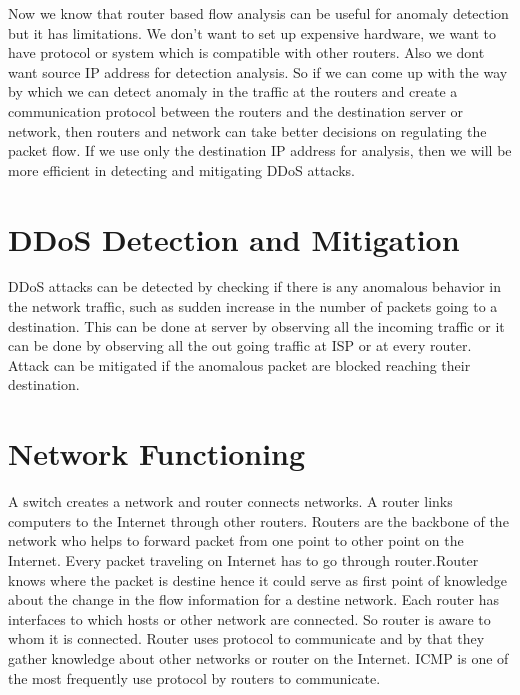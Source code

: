 \documentclass[10pt,oneside,a4paper]{article}
\begin{document}
Now we know that router based flow analysis can be useful for anomaly detection but it has limitations. We don't want to set up expensive hardware, we want to have protocol or system which is compatible with other routers. Also we dont want source IP address for detection analysis. So if we can come up with the way by which we can detect anomaly in the traffic at the routers and create a communication protocol between the routers and the destination server or network, then routers and network can take better decisions on regulating the packet flow. If we use only the destination IP address for analysis, then we will be more efficient in detecting and mitigating DDoS attacks.

\section{DDoS Detection and Mitigation}

DDoS attacks can be detected by checking if there is any anomalous behavior in the network traffic, such as sudden increase in the number of packets going to a destination. This can be done at server by observing all the incoming traffic or it can be done by observing all the out going traffic at ISP or at every router. Attack can be mitigated if the anomalous packet are blocked reaching their destination.

\section{Network Functioning}

A switch creates a network and router connects networks. A router links computers to the Internet through other routers. Routers are the backbone of the network who helps to forward packet from one point to other point on the Internet. Every packet traveling on Internet has to go through router\cite{swithcrouter}.Router knows where the packet is destine hence it could serve as first point of knowledge about the change in the flow information for a destine network. Each router has interfaces to which hosts or other network are connected. So router is aware to whom it is connected. Router uses protocol to communicate and by that they gather knowledge about other networks or router on the Internet. ICMP\cite{icmp} is one of the most frequently use protocol by routers to communicate.\par
\end{document}
